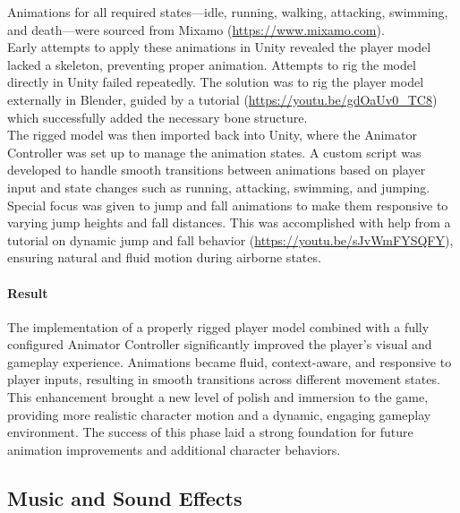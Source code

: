 \documentclass{article}
\begin{document}
Animations for all required states—idle, running, walking, attacking, swimming, and death—were sourced from Mixamo (\url{https://www.mixamo.com}).\\

Early attempts to apply these animations in Unity revealed the player model lacked a skeleton, preventing proper animation. Attempts to rig the model directly in Unity failed repeatedly. The solution was to rig the player model externally in Blender, guided by a tutorial (\url{https://youtu.be/gdOaUv0_TC8}) which successfully added the necessary bone structure.\\

The rigged model was then imported back into Unity, where the Animator Controller was set up to manage the animation states. A custom script was developed to handle smooth transitions between animations based on player input and state changes such as running, attacking, swimming, and jumping.\\

Special focus was given to jump and fall animations to make them responsive to varying jump heights and fall distances. This was accomplished with help from a tutorial on dynamic jump and fall behavior (\url{https://youtu.be/sJvWmFYSQFY}), ensuring natural and fluid motion during airborne states.

\paragraph{Result}\hfill

The implementation of a properly rigged player model combined with a fully configured Animator Controller significantly improved the player's visual and gameplay experience. Animations became fluid, context-aware, and responsive to player inputs, resulting in smooth transitions across different movement states.\\

This enhancement brought a new level of polish and immersion to the game, providing more realistic character motion and a dynamic, engaging gameplay environment. The success of this phase laid a strong foundation for future animation improvements and additional character behaviors.










\newpage
\subsection{Music and Sound Effects}
\end{document}

